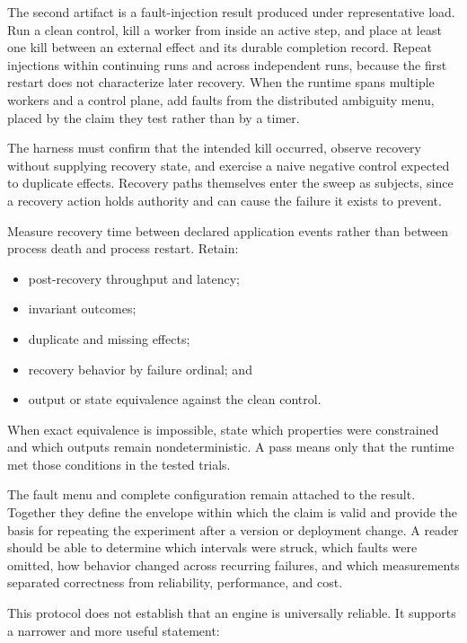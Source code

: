 The second artifact is a fault-injection result produced under representative load. Run a clean control, kill a worker from inside an active step, and place at least one kill between an external effect and its durable completion record. Repeat injections within continuing runs and across independent runs, because the first restart does not characterize later recovery. When the runtime spans multiple workers and a control plane, add faults from the distributed ambiguity menu, placed by the claim they test rather than by a timer.

The harness must confirm that the intended kill occurred, observe recovery without supplying recovery state, and exercise a naive negative control expected to duplicate effects. Recovery paths themselves enter the sweep as subjects, since a recovery action holds authority and can cause the failure it exists to prevent.


Measure recovery time between declared application events rather than between process death and process restart. Retain:

\begin{itemize}
\tightlist
\item
  post-recovery throughput and latency;
\item
  invariant outcomes;
\item
  duplicate and missing effects;
\item
  recovery behavior by failure ordinal; and
\item
  output or state equivalence against the clean control.
\end{itemize}

When exact equivalence is impossible, state which properties were constrained and which outputs remain nondeterministic. A pass means only that the runtime met those conditions in the tested trials.

The fault menu and complete configuration remain attached to the result. Together they define the envelope within which the claim is valid and provide the basis for repeating the experiment after a version or deployment change. A reader should be able to determine which intervals were struck, which faults were omitted, how behavior changed across recurring failures, and which measurements separated correctness from reliability, performance, and cost.

This protocol does not establish that an engine is universally reliable. It supports a narrower and more useful statement:

